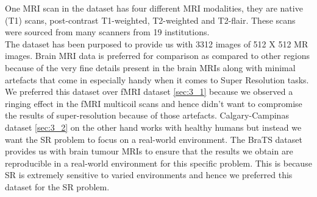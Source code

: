 One MRI scan in the dataset has four different MRI modalities, they are native (T1) scans, post-contrast T1-weighted, T2-weighted and T2-flair. These scans were sourced from many scanners from 19 institutions.\\

The dataset has been purposed to provide us with 3312 images of 512 X 512 MR images. Brain MRI data is preferred for comparison as compared to other regions because of the very fine details present in the brain MRIs along with minimal artefacts that come in especially handy when it comes to Super Resolution tasks.\\

We preferred this dataset over fMRI dataset \ref{sec:3_1} because we observed a ringing effect in the fMRI multicoil scans and hence didn't want to compromise the results of super-resolution because of those artefacts. Calgary-Campinas dataset \ref{sec:3_2} on the other hand works with healthy humans but instead we want the SR problem to focus on a real-world environment. The BraTS dataset provides us with brain tumour MRIs to ensure that the results we obtain are reproducible in a real-world environment for this specific problem. This is because SR is extremely sensitive to varied environments and hence we preferred this dataset for the SR problem.

